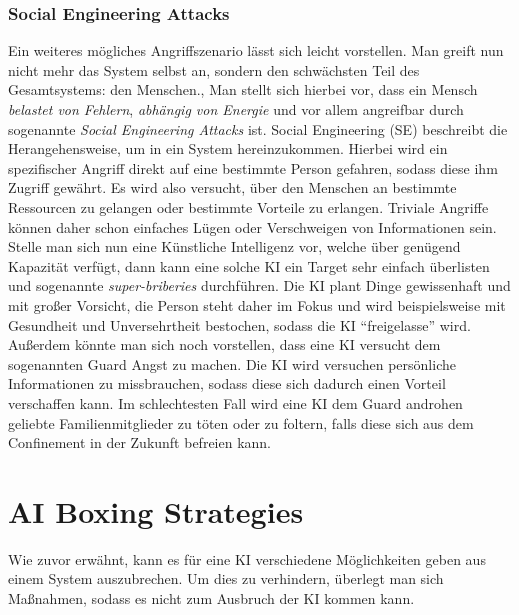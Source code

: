         \subsubsection{Social Engineering Attacks}\label{section:sea}
        Ein weiteres mögliches Angriffszenario lässt sich leicht vorstellen. Man greift nun nicht mehr das System selbst
        an, sondern den schwächsten Teil des Gesamtsystems: den Menschen.\cite{armstrongforthcoming}, \cite{yampolskiy2012leakproofing}
        Man stellt sich hierbei vor, dass ein Mensch \textit{belastet von Fehlern}, \textit{abhängig von Energie}
        und vor allem angreifbar durch sogenannte \textit{Social Engineering Attacks} ist. Social Engineering (SE)
        beschreibt die Herangehensweise, um in ein System hereinzukommen. Hierbei wird ein spezifischer Angriff direkt
        auf eine bestimmte Person gefahren, sodass diese ihm Zugriff gewährt. \cite{yampolskiy2012leakproofing} Es wird
        also versucht, über den Menschen an bestimmte Ressourcen zu gelangen oder bestimmte Vorteile zu erlangen. Triviale
        Angriffe können daher schon einfaches Lügen oder Verschweigen von Informationen sein.
        Stelle man sich nun eine Künstliche Intelligenz vor, welche über genügend Kapazität verfügt, dann kann eine solche
        KI ein Target sehr einfach überlisten und sogenannte \textit{super-briberies} durchführen. \cite{yampolskiy2012leakproofing}
        Die KI plant Dinge gewissenhaft und mit großer Vorsicht, die Person steht daher im Fokus und wird beispielsweise
        mit Gesundheit und Unversehrtheit bestochen, sodass die KI ``freigelasse'' wird. Außerdem könnte man sich noch
        vorstellen, dass eine KI versucht dem sogenannten Guard Angst zu machen. Die KI wird versuchen persönliche
        Informationen zu missbrauchen, sodass diese sich dadurch einen Vorteil verschaffen kann. Im schlechtesten Fall
        wird eine KI dem Guard androhen geliebte Familienmitglieder zu töten oder zu foltern, falls diese sich aus dem
        Confinement in der Zukunft befreien kann.

    \section{AI Boxing Strategies}
        Wie zuvor erwähnt, kann es für eine KI verschiedene Möglichkeiten geben aus einem System auszubrechen. Um dies
        zu verhindern, überlegt man sich Maßnahmen, sodass es nicht zum Ausbruch der KI kommen kann.

